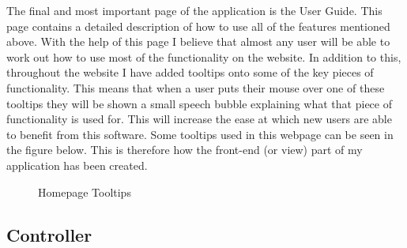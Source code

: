 The final and most important page of the application is the User Guide. This page contains a detailed description of how to use all of the features mentioned above. With the help of this page I believe that almost any user will be able to work out how to use most of the functionality on the website. In addition to this, throughout the website I have added tooltips onto some of the key pieces of functionality. This means that when a user puts their mouse over one of these tooltips they will be shown a small speech bubble explaining what that piece of functionality is used for. This will increase the ease at which new users are able to benefit from this software. Some tooltips used in this webpage can be seen in the figure below. This is therefore how the front-end (or view) part of my application has been created.

\begin{figure}[!ht]
	\centering
	\caption{Homepage Tooltips}
\end{figure}

\subsection{Controller}

